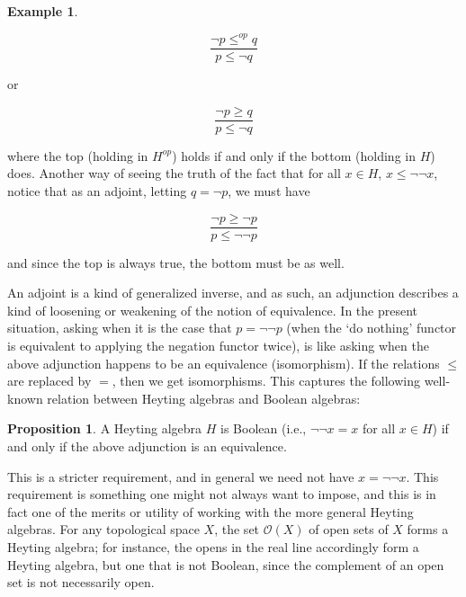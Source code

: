 \documentclass[11pt]{book}
\theoremstyle{definition}
\newtheorem{example}{Example}[section]
\theoremstyle{definition}
\theoremstyle{definition}
\newtheorem{proposition}{Proposition}[section]
\theoremstyle{theorem}
\theoremstyle{definition}
\begin{document}
\begin{example}
	\begin{center} 
		\begin{equation*}
		\frac{\neg p \leq^{op} q}{p \leq \neg q}
		\end{equation*}
	\end{center} 
	or 
	\begin{center} 
		\begin{equation*}
		\frac{\neg p \geq q}{p \leq \neg q}
		\end{equation*}
	\end{center} 
	where the top (holding in $H^{op}$) holds if and only if the bottom (holding in $H$) does. Another way of seeing the truth of the fact that for all $x \in H$, $x \leq \neg \neg x$, notice that as an adjoint, letting $q = \neg p$, we must have 
	\begin{center} 
		\begin{equation*}
		\frac{\neg p \geq \neg p}{p \leq \neg \neg p}
		\end{equation*}
	\end{center} 
	and since the top is always true, the bottom must be as well. \par 
	An adjoint is a kind of generalized inverse, and as such, an adjunction describes a kind of loosening or weakening of the notion of equivalence. In the present situation, asking when it is the case that $p = \neg \neg p$ (when the `do nothing' functor is equivalent to applying the negation functor twice), is like asking when the above adjunction happens to be an equivalence (isomorphism). If the relations $\leq$ are replaced by $=$, then we get isomorphisms. This captures the following well-known relation between Heyting algebras and Boolean algebras: 
	\begin{proposition}
		A Heyting algebra $H$ is Boolean (i.e., $\neg \neg x = x$ for all $x \in H$) if and only if the above adjunction is an equivalence. 
	\end{proposition} \noindent 
This is a stricter requirement, and in general we need not have $x = \neg \neg x$. This requirement is something one might not always want to impose, and this is in fact one of the merits or utility of working with the more general Heyting algebras. For any topological space $X$, the set $\mathscr{O}(X)$ of open sets of $X$ forms a Heyting algebra; for instance, the opens in the real line accordingly form a Heyting algebra, but one that is not Boolean, since the complement of an open set is not necessarily open. \par 

\end{example}
\end{document}
